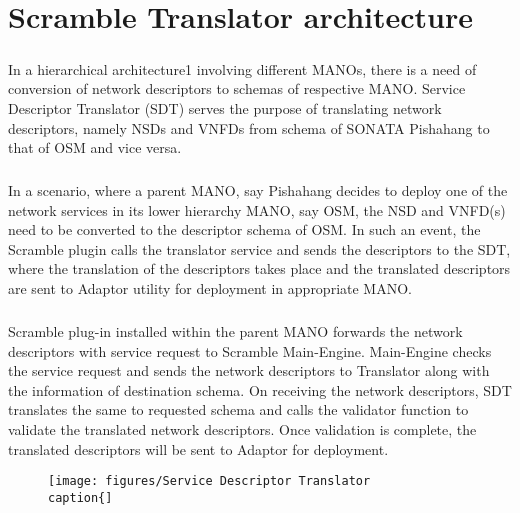 \chapter{Scramble Translator architecture}
\label{ch:Scramble wrapper architecture}

\paragraph{}
In a hierarchical architecture1 involving different MANOs, there is a need of conversion of network descriptors to schemas of respective MANO. Service Descriptor Translator (SDT) serves the purpose of translating network descriptors, namely NSDs and VNFDs from schema of SONATA Pishahang to that of OSM and vice versa.
\paragraph{}
In a scenario, where a parent MANO, say Pishahang decides to deploy one of the network services in its lower hierarchy MANO, say OSM, the NSD and VNFD(s) need to be converted to the descriptor schema of OSM. In such an event, the Scramble plugin calls the translator service and sends the descriptors to the SDT, where the translation of the descriptors takes place and the translated descriptors are sent to Adaptor utility for deployment in appropriate MANO.
\paragraph{}
Scramble plug-in installed within the parent MANO forwards the network descriptors with service request to Scramble Main-Engine. Main-Engine checks the service request and sends the network descriptors to Translator along with the information of destination schema. On receiving the network descriptors, SDT translates the same to requested schema and calls the validator function to validate the translated network descriptors. Once validation is complete, the translated descriptors will be sent to Adaptor for deployment. 


\begin{figure}
	\centering
	\texttt{[image: figures/Service Descriptor Translator
	\\caption\{]}
	\label{fig:translator_architecture}
\end{figure}